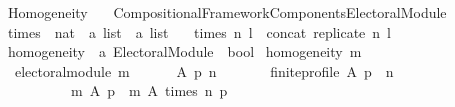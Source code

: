%
\begin{isabellebody}%
%
%
\isadelimtheory
%
\endisadelimtheory
%
\isatagtheory
{}\isamarkupfalse%
\ Homogeneity\isanewline
\ \ \ {\isachardoublequoteopen}{\isachardot}{\kern0pt}{\isachardot}{\kern0pt}{\isacharslash}{\kern0pt}Compositional{\isacharunderscore}{\kern0pt}Framework{\isacharslash}{\kern0pt}Components{\isacharslash}{\kern0pt}Electoral{\isacharunderscore}{\kern0pt}Module{\isachardoublequoteclose}\isanewline
\isanewline
{}%
\endisatagtheory
{\isafoldtheory}%
%
\isadelimtheory
\ \isanewline
%
\endisadelimtheory
\isanewline
{}\isamarkupfalse%
\ times\ {\isacharcolon}{\kern0pt}{\isacharcolon}{\kern0pt}\ {\isachardoublequoteopen}nat\ {\isasymRightarrow}\ {\isacharprime}{\kern0pt}a\ list\ {\isasymRightarrow}\ {\isacharprime}{\kern0pt}a\ list{\isachardoublequoteclose}\ \isanewline
\ \ {\isachardoublequoteopen}times\ n\ l\ {\isacharequal}{\kern0pt}\ concat\ {\isacharparenleft}{\kern0pt}replicate\ n\ l{\isacharparenright}{\kern0pt}{\isachardoublequoteclose}\isanewline
\isanewline
{}\isamarkupfalse%
\ homogeneity\ {\isacharcolon}{\kern0pt}{\isacharcolon}{\kern0pt}\ {\isachardoublequoteopen}{\isacharprime}{\kern0pt}a\ Electoral{\isacharunderscore}{\kern0pt}Module\ {\isasymRightarrow}\ bool{\isachardoublequoteclose}\ \isanewline
{\isachardoublequoteopen}homogeneity\ m\ {\isasymequiv}\isanewline
\ \ electoral{\isacharunderscore}{\kern0pt}module\ m\ {\isasymand}\isanewline
\ \ \ \ {\isacharparenleft}{\kern0pt}{\isasymforall}\ A\ p\ n\ {\isachardot}{\kern0pt}\isanewline
\ \ \ \ \ \ {\isacharparenleft}{\kern0pt}finite{\isacharunderscore}{\kern0pt}profile\ A\ p\ {\isasymand}\ n\ {\isachargreater}{\kern0pt}\ {}\ {\isasymlongrightarrow}\isanewline
\ \ \ \ \ \ \ \ \ \ {\isacharparenleft}{\kern0pt}m\ A\ p\ {\isacharequal}{\kern0pt}\ m\ A\ {\isacharparenleft}{\kern0pt}times\ n\ p{\isacharparenright}{\kern0pt}{\isacharparenright}{\kern0pt}{\isacharparenright}{\kern0pt}{\isacharparenright}{\kern0pt}{\isachardoublequoteclose}\isanewline
%
\isadelimtheory
\isanewline
%
\endisadelimtheory
%
\isatagtheory
{}\isamarkupfalse%
%
\endisatagtheory
{\isafoldtheory}%
%
\isadelimtheory
%
\endisadelimtheory
%
\end{isabellebody}%
\endinput
